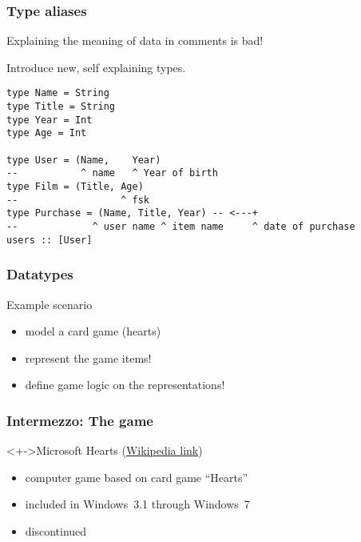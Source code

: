 \documentclass{beamer}
\subtitle{Type definitions}
\begin{document}
\begin{frame}
  \titlepage
\end{frame}
\begin{frame}[fragile]
  \frametitle{Type aliases}
Explaining the meaning of data in comments is bad!

Introduce new, self explaining types.
\begin{verbatim}
type Name = String
type Title = String
type Year = Int
type Age = Int

type User = (Name,    Year)
--           ^ name   ^ Year of birth 
type Film = (Title, Age)
--                  ^ fsk           
type Purchase = (Name, Title, Year) -- <---+
--             ^ user name ^ item name     ^ date of purchase
users :: [User]
\end{verbatim}
\end{frame}
\begin{frame}[fragile]
  \frametitle{Datatypes}
  \begin{block}{Example scenario}
    \begin{itemize}
    \item model a card game (hearts)
    \item represent the game items!
    \item define game logic on the representations!
    \end{itemize}
  \end{block}
\end{frame}
\begin{frame}
  \frametitle{Intermezzo: The game}
  \begin{block}<+->{Microsoft Hearts (\href{https://en.wikipedia.org/wiki/Microsoft_Hearts}{Wikipedia link})}
    \begin{itemize}
    \item computer game based on card game ``Hearts''
    \item included in Windows~3.1 through Windows~7
    \item discontinued
    \end{itemize}    
  \end{block}
\end{frame}
\end{document}
